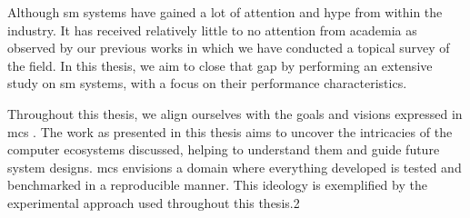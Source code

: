 Although \gls{sm} systems have gained a lot of attention and hype from within the industry. It has received relatively little to no attention from academia as observed by our previous works in which we have conducted a topical survey of the field. In this thesis, we aim to close that gap by performing an extensive study on \gls{sm} systems, with a focus on their performance characteristics.

Throughout this thesis, we align ourselves with the goals and visions expressed in \gls{mcs} \cite{Iosup2018}. The work as presented in this thesis aims to uncover the intricacies of the computer ecosystems discussed, helping to understand them and guide future system designs. \gls{mcs} envisions a domain where everything developed is tested and benchmarked in a reproducible manner. This ideology is exemplified by the experimental approach used  throughout this thesis.2




